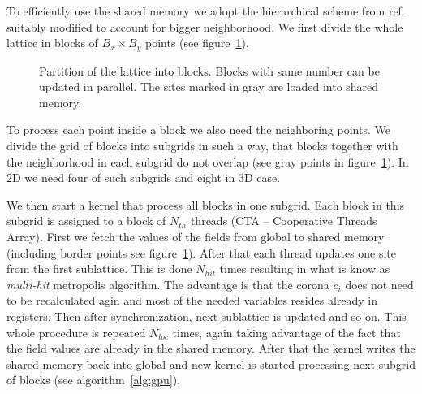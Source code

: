 \documentclass[a4paper]{llncs}
\newcommand{\fillblockgray}[2]{
\pgfmathtruncatemacro\llx{\bksize*(#1)-2}
\pgfmathtruncatemacro\lly{\bksize*(#2)-2}
\pgfmathtruncatemacro\urx{\bksize*(#1+1)+1}
\pgfmathtruncatemacro\ury{\bksize*(#2+1)+1}
\foreach \x in {\llx, ..., \urx}
  \foreach \y in {\lly,...,\ury} {
    \fill[gray] (\x, \y) circle(.25);
  }
}
\newcommand{\npartition}[3]{
\pgfmathtruncatemacro\row{Mod(#2,4)}
\ifnum \row = 0
   \pgfmathtruncatemacro\num{Mod(#1,4)}
\else \ifnum \row  = 1
   \pgfmathtruncatemacro\num{Mod(#1,4)+4}
\else \ifnum \row  = 2
   \pgfmathtruncatemacro\num{Mod(Mod(#1,4)+2,4)}
\else \ifnum \row  = 3
   \pgfmathtruncatemacro\num{Mod(Mod(#1,4)+2,4)+4}
\fi
\fi
\fi
\fi
\ifnum \num = #3
\fill[black] (#1, #2) circle(0.35);
\fi

}
\newcommand{\markpartition}[3]{
\pgfmathtruncatemacro\llx{\bksize*(#1)}
\pgfmathtruncatemacro\lly{\bksize*(#2)}
\pgfmathtruncatemacro\urx{\bksize*(#1+1)-1}
\pgfmathtruncatemacro\ury{\bksize*(#2+1)-1}
\foreach \x in {\llx, ..., \urx}
  \foreach \y in {\lly,...,\ury} {
    \npartition{\x}{\y}{#3}
  }
}
\def\bksize{8}
\def\bkcount{4}
\def\lcsize{5}
\begin{document}
To efficiently use the shared memory  we adopt the hierarchical scheme from
ref.~\cite{weigel} suitably modified to account for bigger
neighborhood.  We first divide the whole lattice in blocks of
$B_x\times B_y$ points (see figure~\ref{fig:blocks}). 
\begin{figure} 
\begin{center}

\end{center}
\caption{\label{fig:blocks}Partition of the lattice into
  blocks. Blocks with same number can be updated in parallel. The sites 
marked in gray are loaded into shared memory.}
\end{figure}
To process each point inside a block we also need the neighboring
points.  We divide the grid of blocks into subgrids in such a way,
that blocks together with the neighborhood in each subgrid do not
overlap (see gray points in figure~\ref{fig:blocks}). In 2D we need
four of such subgrids and eight in 3D case.

We then start a kernel that process all blocks in one subgrid.  Each
block in this subgrid is assigned to a block of $N_{th}$ threads (CTA
-- Cooperative Threads Array). First we fetch the values of the fields
from global to shared memory (including border points see
figure~\ref{fig:blocks}).  After that each thread updates one site
from the first sublattice. This is done $N_{hit}$ times resulting in
what is know as {\em multi-hit} metropolis algorithm. The advantage is
that the corona $c_i$ does not need to be recalculated agin and most
of the needed variables resides already in registers.  Then after
synchronization, next sublattice is updated and so on. This whole
procedure is repeated $N_{loc}$ times, again taking advantage of
the fact that the field values are already in the shared memory. After
that the kernel writes the shared memory back into global and new
kernel is started processing next subgrid of blocks (see
algorithm~\ref{alg:gpu}).
\end{document}
